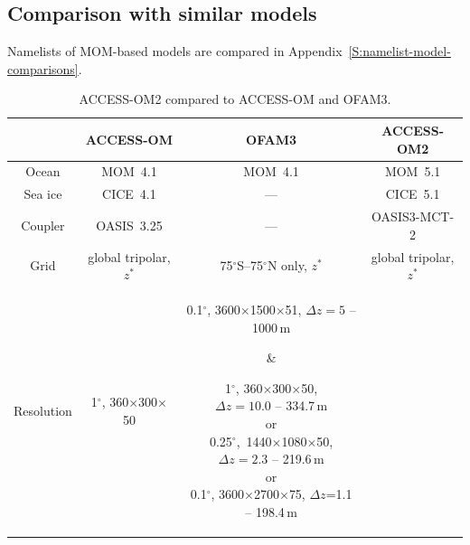 \documentclass[11pt]{article}
\begin{document}
\subsection{Comparison with similar models}
Namelists of MOM-based models are compared in Appendix~\ref{S:namelist-model-comparisons}.


\begin{table}%
\caption{ACCESS-OM2 compared to ACCESS-OM and OFAM3.}
\begin{center}
\begin{tabular}{|c|c|c|c|}
\hline
& \textbf{ACCESS-OM} & \textbf{OFAM3} & \textbf{ACCESS-OM2}\\
\hline
Ocean & MOM~4.1 & MOM~4.1 & MOM~5.1\\
Sea ice & CICE~4.1 & --- & CICE~5.1\\
Coupler & OASIS~3.25 & --- & OASIS3-MCT-2\\
Grid & global tripolar, $z^*$ & 75$^\circ$S--75$^\circ$N only, $z^*$ & global tripolar, $z^*$\\[2ex]
Resolution & 
1$^\circ$, 360$\times$300$\times$50 & 
\parbox[][][c]{22ex}{%
0.1$^\circ$, 3600$\times$1500$\times$51, $\Delta z=5$ -- 1000\,m 
} &
\parbox[][][c]{22ex}{%
1$^\circ$, 360$\times$300$\times$50,\\$\Delta z=10.0$ -- 334.7\,m\\
or\\0.25$^\circ$,~1440$\times$1080$\times$50,\\$\Delta z=2.3$ -- 219.6\,m\\
or\\0.1$^\circ$, 3600$\times$2700$\times$75, $\Delta z$=1.1 -- 198.4\,m\\[-1ex]}\\
\hline
\end{tabular}
\end{center}
\label{T:access-om-ofam3-access-om2}
\end{table}
\end{document}
